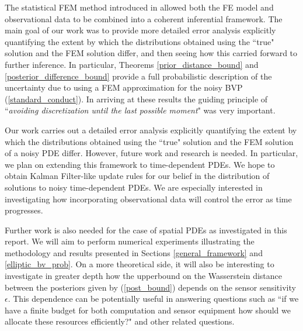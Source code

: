 The statistical FEM method introduced in \textcolor{blue}{\citep{girolami2019statistical}} allowed both the FE model and observational data to be combined into a coherent inferential framework. The main goal of our work was to provide more detailed error analysis explicitly quantifying the extent by which the distributions obtained using the ``true" solution and the FEM solution differ, and then seeing how this carried forward to further inference. In particular, Theorems \textcolor{blue}{\ref{prior_distance_bound}} and \textcolor{blue}{\ref{posterior_difference_bound}} provide a full probabilistic description of the uncertainty due to using a FEM approximation for the noisy BVP (\ref{standard_conduct}). In arriving at these results the guiding principle of ``\textit{avoiding discretization until the last possible moment}" \textcolor{blue}{\citep{stuart2010inverse}} was very important.

Our work carries out a detailed error analysis explicitly quantifying the extent by which the distributions obtained using the ``true" solution and the FEM solution of a noisy PDE differ. However, future work and research is needed. In particular, we plan on extending this framework to time-dependent PDEs. We hope to obtain Kalman Filter-like update rules for our belief in the distribution of solutions to noisy time-dependent PDEs. We are especially interested in investigating how incorporating observational data will control the error as time progresses.

Further work is also needed for the case of spatial PDEs as investigated in this report. We will aim to perform numerical experiments illustrating the methodology and results presented in Sections \textcolor{blue}{\ref{general_framework}} and \textcolor{blue}{\ref{elliptic_bv_prob}}. On a more theoretical side, it will also be interesting to investigate in greater depth how the upperbound on the Wasserstein distance between the posteriors given by (\ref{post_bound}) depends on the sensor sensitivity $\epsilon$. This dependence can be potentially useful in answering questions such as ``if we have a finite budget for both computation and sensor equipment how should we allocate these resources efficiently?" and other related questions.
